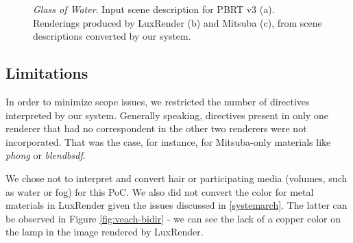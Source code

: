 \begin{figure}
\centering
{}	
\caption{\textit{Glass of Water}. Input scene description for PBRT v3 (a).
	Renderings produced by LuxRender (b) and Mitsuba (c),
	from scene descriptions converted by our system. } 
\label{fig:glass-of-water}
\end{figure}

\subsection{Limitations}
In order to minimize scope issues, we restricted the number of directives 
interpreted by our system. Generally speaking, directives present in only one 
renderer that had no correspondent in the other two renderers were not 
incorporated. That was the case, for instance, for Mitsuba-only materials like 
\textit{phong} or \textit{blendbsdf}. 

We chose not to interpret and convert hair or participating media (volumes, such 
as water or fog) for this PoC. We also did not convert the color for metal 
materials in LuxRender given the issues discussed in \ref{systemarch}. The 
latter can be observed in Figure \ref{fig:veach-bidir} - we can see the lack of a 
copper color on the lamp in the image rendered by LuxRender.




